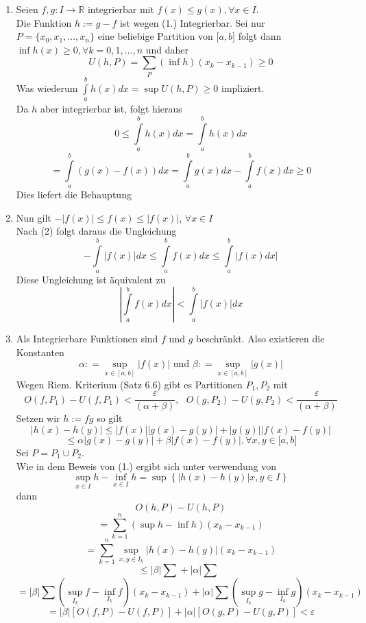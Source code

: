 \begin{enumerate}
\item Seien $f,g:I\rightarrow\mathbb{R}$ integrierbar mit $f(x)\leq g(x), \forall x \in I$.\\
Die Funktion $h:=g-f$ ist wegen (1.) Integrierbar. Sei nur $P=\{x_0,x_1,\dots,x_n\}$ eine beliebige Partition von $\lbrack a,b\rbrack$ folgt dann $\inf h(x) \ge 0,\forall k = 0,1, \ldots ,n$ und daher \[U(h,P) = \sum\limits_P {(\inf h)({x_k} - {x_{k - 1}}) \ge 0} \]
Was wiederum $\int\limits_{\underline{a}}^b {h(x)dx = \sup U(h,P) \ge 0} $ impliziert. \\
Da $h$ aber integrierbar ist, folgt hieraus \[0 \le \int\limits_{\underline{a}}^b {h(x)dx = \int\limits_a^b {h(x)dx} } \]
\[ = \int\limits_a^b {(g(x) - f(x))dx = \int\limits_a^b {g(x)dx - \int\limits_a^b {f(x)dx} } }\geq 0 \]
Dies liefert die Behauptung
\item Nun gilt $ - \left| {f(x)} \right| \le f(x) \le \left| {f(x)} \right|$, $\forall x\in I$\\
Nach (2) folgt daraus die Ungleichung 
\[ - \int\limits_a^b {\left| {f(x)} \right|dx}  \le \int\limits_a^b {f(x)dx}  \le \int\limits_a^b {\left| {f(x)dx} \right|} \]
Diese Ungleichung ist äquivalent zu
\[\left| {\int\limits_a^b {f(x)dx} } \right| < \int\limits_a^b {\left| {f(x)} \right|dx} \]
\item Als Integrierbare Funktionen sind $f$ und $g$ beschränkt. Also existieren die Konstanten 
\[\alpha : = \mathop {\sup }\limits_{x \in [a,b]} \left| {f(x)} \right|{\text{ und }}\beta : = \mathop {\sup }\limits_{x \in [a,b]} \left| {g(x)} \right|\]
Wegen Riem. Kriterium (Satz 6.6) gibt es Partitionen $P_1,P_2$ mit
$$O(f,P_1)-U(f,P_1)<\frac{\varepsilon}{(\alpha + \beta)}, \text{    } O(g,P_2)-U(g,P_2)<\frac{\varepsilon}{(\alpha + \beta)}$$
Setzen wir $h:=fg$ so gilt
\[\left| {h(x) - h(y)} \right| \le \left| {f(x)} \right|\left| {g(x) - g(y)} \right| + \left| {g(y)} \right|\left| {f(x) - f(y)} \right|\]
\[ \le \alpha \left| {g(x) - g(y)} \right| + \beta \left| {f(x) - f(y)} \right|, \forall x,y\in \lbrack a,b\rbrack\]
Sei $P=P_1\cup P_2$.\\
Wie in dem Beweis von (1.) ergibt sich unter verwendung von \[\mathop {\sup }\limits_{x \in I} h - \mathop {\inf }\limits_{x \in I} h = \sup \left\{ {\left| {h(x) - h(y)} \right|x,y \in I} \right\}\]
dann 
$$O(h,P)-U(h,P)$$
\[ = \sum\limits_{k = 1}^n {(\sup h - \inf h)({x_k} - {x_{k - 1}})} \]
\[ = \sum\limits_{k = 1}^n {\mathop {\sup }\limits_{x,y \in {I_k}} \left| {h(x) - h(y)} \right|({x_k} - {x_{k - 1}})} \]
\[ \le \left| \beta  \right|\sum {\mathop {\mathop {\sup }\limits_{{I_k}} \left| {f(x) - f(y)} \right|({x_k} - {x_{k - 1}}) + }} \left| \alpha  \right|\sum {\mathop {\mathop {\sup }\limits_{{I_k}} \left| {g(x) - g(y)} \right|({x_k} - {x_{k - 1}})} } \]
\[ = \left| \beta  \right|\sum {(\mathop {\sup }\limits_{{I_k}} f - \mathop {\inf }\limits_{{I_k}} f)({x_k} - {x_{k - 1}})}  + \left| \alpha  \right|\sum {(\mathop {\sup }\limits_{{I_k}} g - \mathop {\inf }\limits_{{I_k}} g)({x_k} - {x_{k - 1}})} \]
\[ = \left| \beta  \right|[O(f,P) - U(f,P)] + \left| \alpha  \right|[O(g,P) - U(g,P)] < \varepsilon \]

\end{enumerate}


